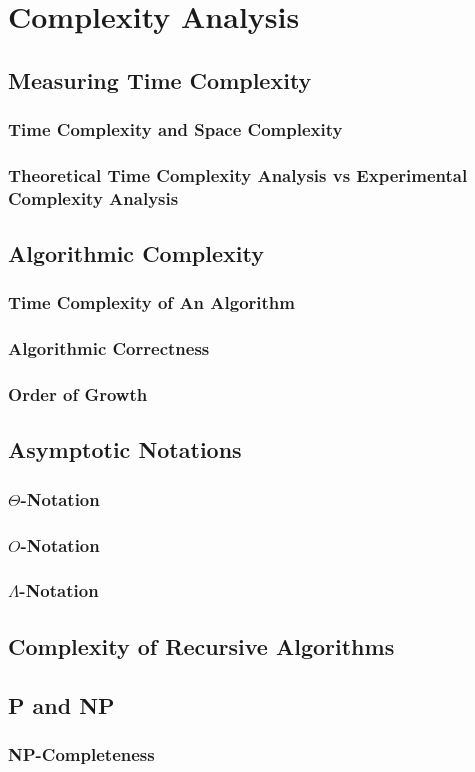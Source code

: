 \chapter{Complexity Analysis}
\section{Measuring Time Complexity}
\subsection{Time Complexity and Space Complexity}
\subsection{Theoretical Time Complexity Analysis vs Experimental Complexity Analysis}
\section{Algorithmic Complexity}
\subsection{Time Complexity of An Algorithm}
\subsection{Algorithmic Correctness}
\subsection{Order of Growth}
\section{Asymptotic Notations}
\subsection{$\Theta$-Notation}
\subsection{$O$-Notation}
\subsection{$\Lambda$-Notation}
\section{Complexity of Recursive Algorithms}
\section{P and NP}
\subsection{NP-Completeness}